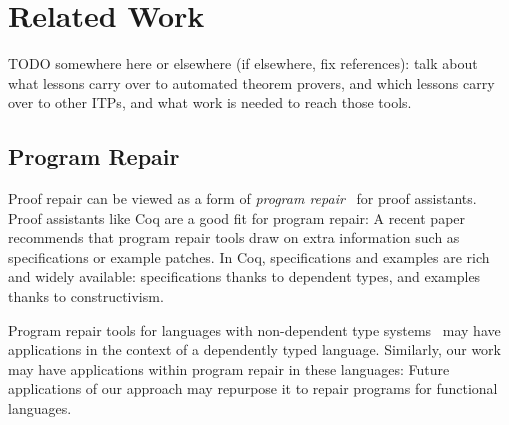 \chapter{Related Work}
\label{sec:related}


TODO somewhere here or elsewhere (if elsewhere, fix references): talk about what lessons carry over to automated theorem provers,
and which lessons carry over to other ITPs, and what work is needed to reach those tools.

\section{Program Repair}


Proof repair can be viewed as a form of \textit{program repair}~\cite{Monperrus:2018:ASR:3177787.3105906, Gazzola:2018:ASR:3180155.3182526}
for proof assistants.
Proof assistants like Coq are a good fit for program repair: A recent paper~\cite{Qi:2015:APP:2771783.2771791} 
recommends that program repair tools draw on extra information
such as specifications or example patches. In Coq, specifications and examples 
are rich and widely available: specifications thanks to dependent types,
and examples thanks to constructivism.


Program repair tools for 
languages with non-dependent type 
systems~\cite{Pei:2014:APR:2731750.2731779, Long:2016:APG:2837614.2837617, Le:2017:SSS:3106237.3106309, Mechtaev:2016:ASM:2884781.2884807, Monperrus2015} 
may have applications in the context of a dependently typed language.
Similarly, our work may have applications within program repair in these languages:
Future applications of our approach may repurpose it to repair programs for functional languages.


